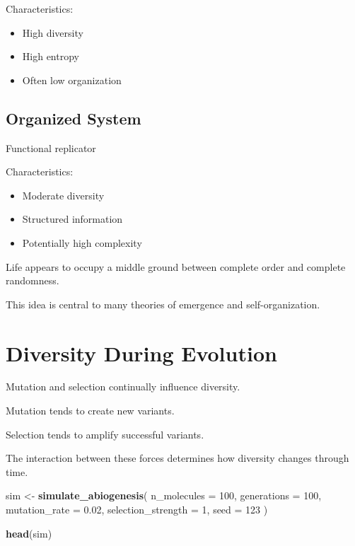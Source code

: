 \documentclass[
  oneside,
  openany]{book}
\newenvironment{Shaded}{\begin{snugshade}}{\end{snugshade}}
\newcommand{\AttributeTok}[1]{\textcolor[rgb]{0.13,0.29,0.53}{#1}}
\newcommand{\DecValTok}[1]{\textcolor[rgb]{0.00,0.00,0.81}{#1}}
\newcommand{\FloatTok}[1]{\textcolor[rgb]{0.00,0.00,0.81}{#1}}
\newcommand{\FunctionTok}[1]{\textcolor[rgb]{0.13,0.29,0.53}{\textbf{#1}}}
\newcommand{\NormalTok}[1]{#1}
\newcommand{\OtherTok}[1]{\textcolor[rgb]{0.56,0.35,0.01}{#1}}
\providecommand{\tightlist}{%
  \setlength{\itemsep}{0pt}\setlength{\parskip}{0pt}}
\begin{document}
Characteristics:

\begin{itemize}
\tightlist
\item
  High diversity
\item
  High entropy
\item
  Often low organization
\end{itemize}

\subsection{Organized System}\label{organized-system}

\begin{Shaded}
\begin{Highlighting}[]
\NormalTok{Functional replicator}
\end{Highlighting}
\end{Shaded}

Characteristics:

\begin{itemize}
\tightlist
\item
  Moderate diversity
\item
  Structured information
\item
  Potentially high complexity
\end{itemize}

Life appears to occupy a middle ground between complete order and complete randomness.

This idea is central to many theories of emergence and self-organization.

\section{Diversity During Evolution}\label{diversity-during-evolution}

Mutation and selection continually influence diversity.

Mutation tends to create new variants.

Selection tends to amplify successful variants.

The interaction between these forces determines how diversity changes through time.

\begin{Shaded}
\begin{Highlighting}[]
\NormalTok{sim }\OtherTok{\textless{}{-}} \FunctionTok{simulate\_abiogenesis}\NormalTok{(}
  \AttributeTok{n\_molecules =} \DecValTok{100}\NormalTok{,}
  \AttributeTok{generations =} \DecValTok{100}\NormalTok{,}
  \AttributeTok{mutation\_rate =} \FloatTok{0.02}\NormalTok{,}
  \AttributeTok{selection\_strength =} \DecValTok{1}\NormalTok{,}
  \AttributeTok{seed =} \DecValTok{123}
\NormalTok{)}

\FunctionTok{head}\NormalTok{(sim)}
\end{Highlighting}
\end{Shaded}
\end{document}
